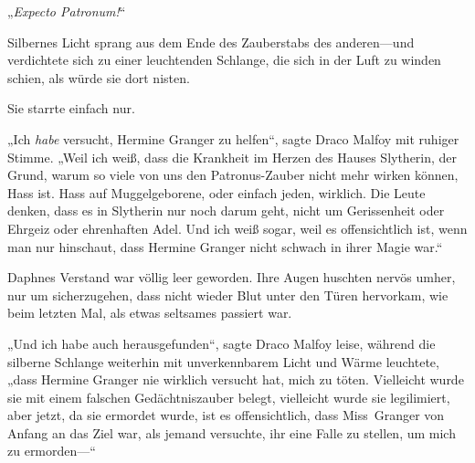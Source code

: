 „\emph{Expecto Patronum!}“

Silbernes Licht sprang aus dem Ende des Zauberstabs des anderen—und verdichtete sich zu einer leuchtenden Schlange, die sich in der Luft zu winden schien, als würde sie dort nisten.

Sie starrte einfach nur.

„Ich \emph{habe} versucht, Hermine Granger zu helfen“, sagte Draco Malfoy mit ruhiger Stimme. „Weil ich weiß, dass die Krankheit im Herzen des Hauses Slytherin, der Grund, warum so viele von uns den Patronus-Zauber nicht mehr wirken können, Hass ist. Hass auf Muggelgeborene, oder einfach jeden, wirklich. Die Leute denken, dass es in Slytherin nur noch darum geht, nicht um Gerissenheit oder Ehrgeiz oder ehrenhaften Adel. Und ich weiß sogar, weil es offensichtlich ist, wenn man nur hinschaut, dass Hermine Granger nicht schwach in ihrer Magie war.“

Daphnes Verstand war völlig leer geworden. Ihre Augen huschten nervös umher, nur um sicherzugehen, dass nicht wieder Blut unter den Türen hervorkam, wie beim letzten Mal, als etwas seltsames passiert war.

„Und ich habe auch herausgefunden“, sagte Draco Malfoy leise, während die silberne Schlange weiterhin mit unverkennbarem Licht und Wärme leuchtete, „dass Hermine Granger nie wirklich versucht hat, mich zu töten. Vielleicht wurde sie mit einem falschen Gedächtniszauber belegt, vielleicht wurde sie legilimiert, aber jetzt, da sie ermordet wurde, ist es offensichtlich, dass Miss~Granger von Anfang an das Ziel war, als jemand versuchte, ihr eine Falle zu stellen, um mich zu ermorden—“

